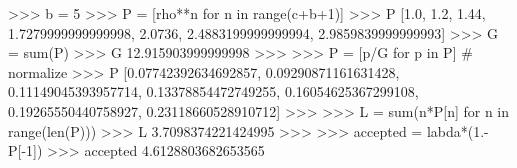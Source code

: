
>>> b = 5
>>> P = [rho**n for n in range(c+b+1)]
>>> P
[1.0, 1.2, 1.44, 1.7279999999999998, 2.0736, 2.4883199999999994,
2.9859839999999993]
>>> G = sum(P)
>>> G
12.915903999999998
>>>
>>> P = [p/G for p in P] # normalize
>>> P
[0.07742392634692857, 0.09290871161631428, 0.11149045393957714,
0.13378854472749255, 0.16054625367299108, 0.19265550440758927,
0.23118660528910712]
>>>
>>> L = sum(n*P[n] for n in range(len(P)))
>>> L
3.7098374221424995
>>>
>>> accepted = labda*(1.-P[-1])
>>> accepted
4.6128803682653565

